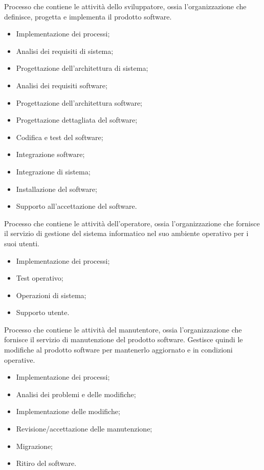 Processo che contiene le attività dello sviluppatore, ossia l'organizzazione che
definisce, progetta e implementa il prodotto software.
\begin{itemize}
    \item Implementazione dei processi;
    \item Analisi dei requisiti di sistema;
    \item Progettazione dell'architettura di sistema;
    \item Analisi dei requisiti software;
    \item Progettazione dell'architettura software;
    \item Progettazione dettagliata del software;
    \item Codifica e test del software;
    \item Integrazione software;
    \item Integrazione di sistema;
    \item Installazione del software;
    \item Supporto all'accettazione del software.
\end{itemize}

Processo che contiene le attività dell'operatore, ossia l'organizzazione che
fornisce il servizio di gestione del sistema informatico nel suo ambiente 
operativo per i suoi utenti.
\begin{itemize}
    \item Implementazione dei processi;
    \item Test operativo;
    \item Operazioni di sistema;
    \item Supporto utente.
\end{itemize}

Processo che contiene le attività del manutentore, ossia l'organizzazione che
fornisce il servizio di manutenzione del prodotto software. Gestisce quindi 
le modifiche al prodotto software per mantenerlo aggiornato e in condizioni operative. 
\begin{itemize}
    \item Implementazione dei processi;
    \item Analisi dei problemi e delle modifiche;
    \item Implementazione delle modifiche;
    \item Revisione/accettazione delle manutenzione;
    \item Migrazione;
    \item Ritiro del software.
\end{itemize}

